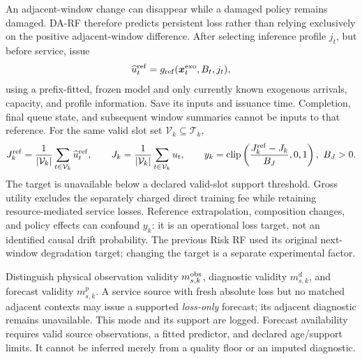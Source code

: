 \documentclass[10pt]{article}
\DeclareMathOperator{\clip}{clip}
\begin{document}
An adjacent-window change can disappear while a damaged policy remains damaged.
DA-RF therefore predicts persistent loss rather than relying exclusively on the
positive adjacent-window difference. After selecting inference profile $j_t$,
but before service, issue
\begin{equation}
 \widehat u_t^{\rm ref}=g_{\rm ref}(\boldsymbol x_t^{\rm exo},B_t,j_t),
\end{equation}
using a prefix-fitted, frozen model and only currently known exogenous arrivals,
capacity, and profile information. Save its inputs and issuance time.
Completion, final queue state, and subsequent window summaries cannot be inputs
to that reference. For the same valid slot set $\mathcal V_k\subseteq\mathcal T_k$,
\begin{equation}
 J_k^{\rm ref}=\frac1{|\mathcal V_k|}\sum_{t\in\mathcal V_k}\widehat u_t^{\rm ref},
 \qquad J_k=\frac1{|\mathcal V_k|}\sum_{t\in\mathcal V_k}u_t,
 \qquad
 y_k=\clip\left(\frac{J_k^{\rm ref}-J_k}{B_J},0,1\right),\ B_J>0.
 \label{eq:persistent-target}
\end{equation}
The target is unavailable below a declared valid-slot support threshold.
Gross utility excludes the separately charged direct training fee while
retaining resource-mediated service losses. Reference extrapolation, composition
changes, and policy effects can confound $y_k$: it is an operational loss target,
not an identified causal drift probability. The previous Risk RF used its
original next-window degradation target; changing the target is a separate
experimental factor.

Distinguish physical observation validity $m^{\rm obs}_{s,k}$, diagnostic validity
$m^d_{s,k}$, and forecast validity $m^p_{s,k}$. A service source with fresh absolute
loss but no matched adjacent contexts may issue a supported \emph{loss-only}
forecast; its adjacent diagnostic remains unavailable. This mode and its support
are logged. Forecast availability requires valid source observations, a fitted
predictor, and declared age/support limits. It cannot be inferred merely from a
quality floor or an imputed diagnostic.
\end{document}
